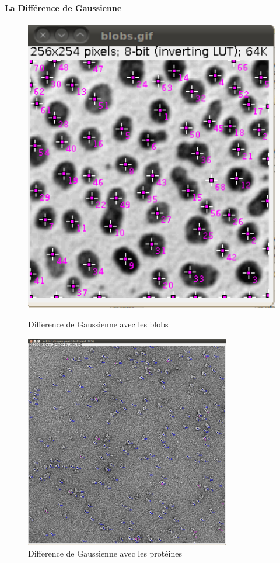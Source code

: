 \paragraph*{La Différence de Gaussienne} 
\begin{figure}[H]
 \begin{minipage}{.25\linewidth}
  \includegraphics[width=2\textwidth]{blobsDog.png}  
  \caption{Difference de Gaussienne avec les blobs}
 \end{minipage} \hfill
\begin{minipage}{.50\linewidth}
  \includegraphics[width=0.8\textwidth]{protDog.png}   
  \caption{Difference de Gaussienne avec les protéines}
 \end{minipage} \hfill

\end{figure}
